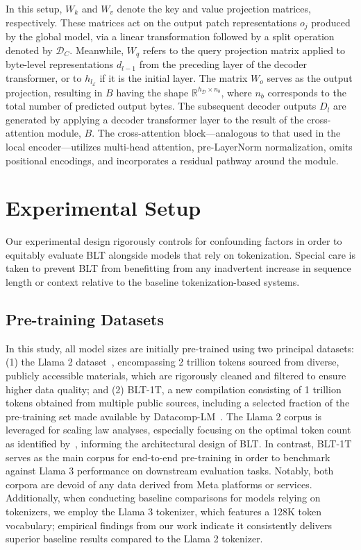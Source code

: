 In this setup, $W_k$ and $W_v$ denote the key and value projection matrices, respectively. These matrices act on the output patch representations $o_j$ produced by the global model, via a linear transformation followed by a split operation denoted by $\mathcal{D}_C$. Meanwhile, $W_q$ refers to the query projection matrix applied to byte-level representations $d_{l-1}$ from the preceding layer of the decoder transformer, or to $h_{l_{\mathcal{E}}}$ if it is the initial layer. The matrix $W_o$ serves as the output projection, resulting in $B$ having the shape $\mathbb{R}^{h_{\mathcal{D}} \times n_b}$, where $n_b$ corresponds to the total number of predicted output bytes. The subsequent decoder outputs $D_l$ are generated by applying a decoder transformer layer to the result of the cross-attention module, $B$. The cross-attention block—analogous to that used in the local encoder—utilizes multi-head attention, pre-LayerNorm normalization, omits positional encodings, and incorporates a residual pathway around the module.

\section{Experimental Setup}
\label{section:experiments}
Our experimental design rigorously controls for confounding factors in order to equitably evaluate {\textsc BLT} alongside models that rely on tokenization. Special care is taken to prevent {\textsc BLT} from benefitting from any inadvertent increase in sequence length or context relative to the baseline tokenization-based systems.

\subsection{Pre-training Datasets}

In this study, all model sizes are initially pre-trained using two principal datasets: (1) the Llama 2 dataset~\citep{touvron2023llama}, encompassing 2 trillion tokens sourced from diverse, publicly accessible materials, which are rigorously cleaned and filtered to ensure higher data quality; and (2) {\textsc BLT}-1T, a new compilation consisting of 1 trillion tokens obtained from multiple public sources, including a selected fraction of the pre-training set made available by Datacomp-LM~\citep{li2024datacomp}. The Llama 2 corpus is leveraged for scaling law analyses, especially focusing on the optimal token count as identified by~\cite{dubey2024llama}, informing the architectural design of {\textsc BLT}. In contrast, {\textsc BLT}-1T serves as the main corpus for end-to-end pre-training in order to benchmark against Llama 3 performance on downstream evaluation tasks. Notably, both corpora are devoid of any data derived from Meta platforms or services. Additionally, when conducting baseline comparisons for models relying on tokenizers, we employ the Llama 3 tokenizer, which features a 128K token vocabulary; empirical findings from our work indicate it consistently delivers superior baseline results compared to the Llama 2 tokenizer.


